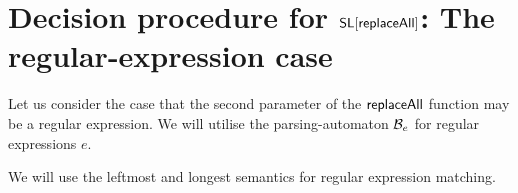 
\section{Decision procedure for $\mathsf{SL}[\mathsf{replaceAll}]$: The regular-expression case}

Let us consider the case that the second parameter of the $\mathsf{replaceAll}$ function may be a regular expression. 
We will utilise the parsing-automaton $\mathcal{B}_e$ for regular expressions $e$. 

We will use the leftmost and longest semantics for regular expression matching.

